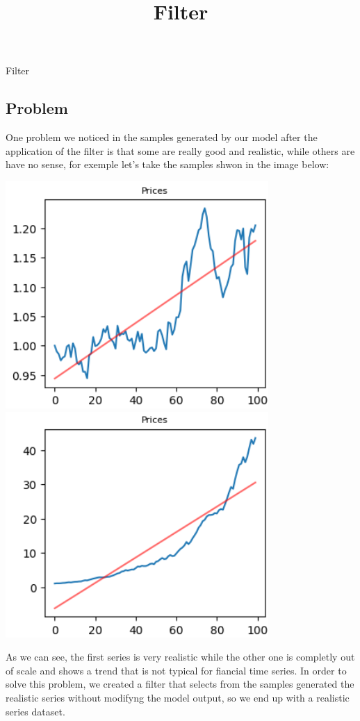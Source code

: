 \documentclass{article}
\title{Filter}
\begin{document}
\begin{center}
    {\huge{Filter}}
\end{center}    
    \begin{multicols}{2}
    \section*{Problem}
    One problem we noticed in the samples generated by our model after the application of the filter is that some are really good and realistic, while others are 
    have no sense, for exemple let's take the samples shwon in the image below:
    \begin{center}
        \includegraphics[scale=0.49]{imgs/serie_comp_1.png}
        \includegraphics[scale=0.49]{imgs/serie_comp_2.png}
    \end{center}
    As we can see, the first series is very realistic while the other one is completly out of scale and shows a trend that is not 
    typical for fiancial time series. In order to solve this problem, we created a filter that selects from the samples generated the realistic series without modifyng the model output, so we end up with a realistic series dataset.

\end{multicols}
\end{document}

